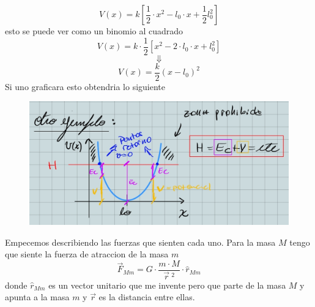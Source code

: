 \documentclass[../Main.tex]{subfiles}
\begin{document}
\npage{
}
{

\begin{equation*}
    V(x) = k \left[ \frac{1}{2} \cdot x^2 - l_0 \cdot x + \frac{1}{2} l_0^2 \right]
\end{equation*}
esto se puede ver como un binomio al cuadrado
\begin{equation*}
    V(x) = k \cdot \frac{1}{2} \left[ x^2 - 2 \cdot l_0 \cdot x + l_0^2 \right]
\end{equation*}
\begin{equation*}
    \Downarrow
\end{equation*}
\begin{equation*}
    V(x) = \frac{k}{2} \left( x - l_0 \right)^2
\end{equation*}
Si uno graficara esto obtendria lo siguiente
\begin{figure}[H]
    \begin{center}
        \includegraphics[scale=0.5]{Images/potencial_resorte.jpg}
    \end{center}
\end{figure}


Empecemos describiendo las fuerzas que sienten cada uno. Para la masa $M$ tengo
que siente la fuerza de atraccion de la masa $m$
\begin{equation*}
    \vec{F}_{Mm} = G \cdot \frac{m \cdot M}{\vec{r} \ ^2} \cdot \hat{r}_{Mm}
\end{equation*}
donde $\hat{r}_{Mm}$ es un vector unitario que me invente pero que parte de la
masa $M$ y apunta a la masa $m$ y $\vec{r}$ es la distancia entre ellas.

}
\end{document}
